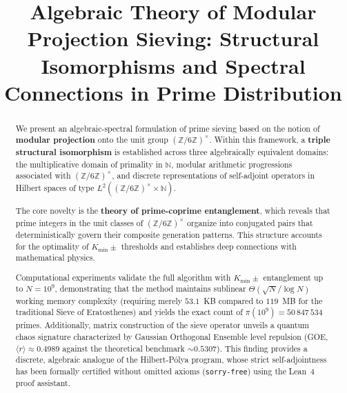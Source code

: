 \documentclass{article}
\numberwithin{equation}{section}
\theoremstyle{plain}
\theoremstyle{definition}
\begin{document}
\title{Algebraic Theory of Modular Projection Sieving: Structural Isomorphisms and Spectral Connections in Prime Distribution}





\begin{abstract}
We present an algebraic-spectral formulation of prime sieving based on the notion of \textbf{modular projection} onto the unit group $(\mathbb{Z}/6\mathbb{Z})^\times$. Within this framework, a \textbf{triple structural isomorphism} is established across three algebraically equivalent domains: the multiplicative domain of primality in $\mathbb{N}$, modular arithmetic progressions associated with $(\mathbb{Z}/6\mathbb{Z})^\times$, and discrete representations of self-adjoint operators in Hilbert spaces of type $L^2((\mathbb{Z}/6\mathbb{Z})^\times \times \mathbb{N})$.

The core novelty is the \textbf{theory of prime-coprime entanglement}, which reveals that prime integers in the unit classes of $(\mathbb{Z}/6\mathbb{Z})^\times$ organize into conjugated pairs that deterministically govern their composite generation patterns. This structure accounts for the optimality of $K_{\min}\pm$ thresholds and establishes deep connections with mathematical physics.

Computational experiments validate the full algorithm with $K_{\min}\pm$ entanglement up to $N=10^9$, demonstrating that the method maintains sublinear $\Theta(\sqrt{N}/\log N)$ working memory complexity (requiring merely $53.1$~KB compared to $119$~MB for the traditional Sieve of Eratosthenes) and yields the exact count of $\pi(10^9)=50\,847\,534$ primes. Additionally, matrix construction of the sieve operator unveils a quantum chaos signature characterized by Gaussian Orthogonal Ensemble level repulsion (GOE, $\langle r \rangle \approx 0.4989$ against the theoretical benchmark $\sim 0.5307$). This finding provides a discrete, algebraic analogue of the Hilbert-Pólya program, whose strict self-adjointness has been formally certified without omitted axioms (\texttt{sorry-free}) using the Lean~4 proof assistant.
\end{abstract}
\end{document}
